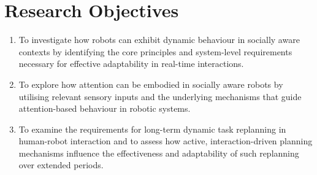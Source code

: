 \section{Research Objectives}
\label{sec::ResearchObjectives}

\begin{enumerate}
    \item To investigate how robots can exhibit dynamic behaviour in socially aware contexts by identifying the core principles and system-level requirements necessary for effective adaptability in real-time interactions.

    \item To explore how attention can be embodied in socially aware robots by utilising relevant sensory inputs and the underlying mechanisms that guide attention-based behaviour in robotic systems.

    \item To examine the requirements for long-term dynamic task replanning in human-robot interaction and to assess how active, interaction-driven planning mechanisms influence the effectiveness and adaptability of such replanning over extended periods.
\end{enumerate}